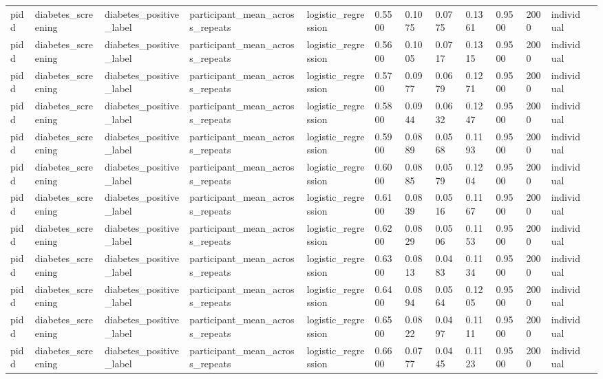 \begin{tabular}{lllllllllllll}
pidd & diabetes\_screening & diabetes\_positive\_label & participant\_mean\_across\_repeats & logistic\_regression & 0.5500 & 0.1075 & 0.0775 & 0.1361 & 0.9500 & 2000 & individual &  \\
pidd & diabetes\_screening & diabetes\_positive\_label & participant\_mean\_across\_repeats & logistic\_regression & 0.5600 & 0.1005 & 0.0717 & 0.1315 & 0.9500 & 2000 & individual &  \\
pidd & diabetes\_screening & diabetes\_positive\_label & participant\_mean\_across\_repeats & logistic\_regression & 0.5700 & 0.0977 & 0.0679 & 0.1271 & 0.9500 & 2000 & individual &  \\
pidd & diabetes\_screening & diabetes\_positive\_label & participant\_mean\_across\_repeats & logistic\_regression & 0.5800 & 0.0944 & 0.0632 & 0.1247 & 0.9500 & 2000 & individual &  \\
pidd & diabetes\_screening & diabetes\_positive\_label & participant\_mean\_across\_repeats & logistic\_regression & 0.5900 & 0.0889 & 0.0568 & 0.1193 & 0.9500 & 2000 & individual &  \\
pidd & diabetes\_screening & diabetes\_positive\_label & participant\_mean\_across\_repeats & logistic\_regression & 0.6000 & 0.0885 & 0.0579 & 0.1204 & 0.9500 & 2000 & individual &  \\
pidd & diabetes\_screening & diabetes\_positive\_label & participant\_mean\_across\_repeats & logistic\_regression & 0.6100 & 0.0839 & 0.0516 & 0.1167 & 0.9500 & 2000 & individual &  \\
pidd & diabetes\_screening & diabetes\_positive\_label & participant\_mean\_across\_repeats & logistic\_regression & 0.6200 & 0.0829 & 0.0506 & 0.1153 & 0.9500 & 2000 & individual &  \\
pidd & diabetes\_screening & diabetes\_positive\_label & participant\_mean\_across\_repeats & logistic\_regression & 0.6300 & 0.0813 & 0.0483 & 0.1134 & 0.9500 & 2000 & individual &  \\
pidd & diabetes\_screening & diabetes\_positive\_label & participant\_mean\_across\_repeats & logistic\_regression & 0.6400 & 0.0894 & 0.0564 & 0.1205 & 0.9500 & 2000 & individual &  \\
pidd & diabetes\_screening & diabetes\_positive\_label & participant\_mean\_across\_repeats & logistic\_regression & 0.6500 & 0.0822 & 0.0497 & 0.1111 & 0.9500 & 2000 & individual &  \\
pidd & diabetes\_screening & diabetes\_positive\_label & participant\_mean\_across\_repeats & logistic\_regression & 0.6600 & 0.0777 & 0.0445 & 0.1123 & 0.9500 & 2000 & individual &  \\

\end{tabular}
